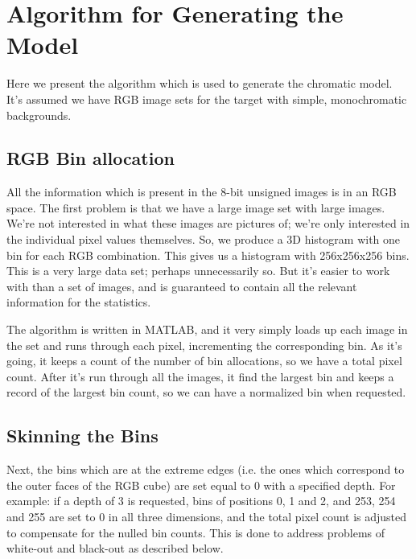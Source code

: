 \section{Algorithm for Generating the Model}\label{sec:AlgorithmForGeneratingModel}
Here we present the algorithm which is used to generate the chromatic model. It's assumed we have RGB image sets for the target with simple, monochromatic backgrounds.




\subsection{RGB Bin allocation}\label{sec:RGBBinAllocation}
All the information which is present in the 8-bit unsigned images is in an RGB space. The first problem is that we have a large image set with large images. We're not interested in what these images are pictures of; we're only interested in the individual pixel values themselves. So, we produce a 3D histogram with one bin for each RGB combination. This gives us a histogram with 256x256x256 bins. This is a very large data set; perhaps unnecessarily so. But it's easier to work with than a set of images, and is guaranteed to contain all the relevant information for the statistics. 

The algorithm is written in MATLAB, and it very simply loads up each image in the set and runs through each pixel, incrementing the corresponding bin. As it's going, it keeps a count of the number of bin allocations, so we have a total pixel count. After it's run through all the images, it find the largest bin and keeps a record of the largest bin count, so we can have a normalized bin when requested.


\subsection{Skinning the Bins}\label{sec:SkinningTheBins}
Next, the bins which are at the extreme edges (i.e. the ones which correspond to the outer faces of the RGB cube) are set equal to 0 with a specified depth. For example: if a depth of 3 is requested, bins of positions 0, 1 and 2, and 253, 254 and 255 are set to 0 in all three dimensions, and the total pixel count is adjusted to compensate for the nulled bin counts. This is done to address problems of white-out and black-out as described below.

